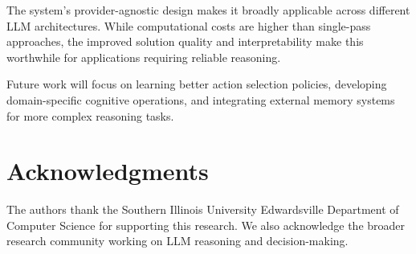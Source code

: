 \documentclass[conference]{IEEEtran}
\begin{document}
The system's provider-agnostic design makes it broadly applicable across different LLM architectures. While computational costs are higher than single-pass approaches, the improved solution quality and interpretability make this worthwhile for applications requiring reliable reasoning.

Future work will focus on learning better action selection policies, developing domain-specific cognitive operations, and integrating external memory systems for more complex reasoning tasks.

\section*{Acknowledgments}

The authors thank the Southern Illinois University Edwardsville Department of Computer Science for supporting this research. We also acknowledge the broader research community working on LLM reasoning and decision-making.
\end{document}
